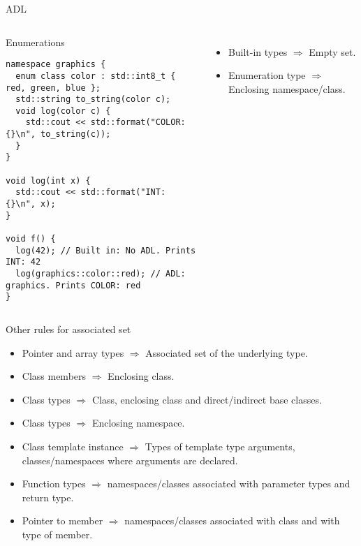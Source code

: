 \begin{frame}[t,fragile]{ADL}

\begin{columns}[T]

\begin{block}{Enumerations}
\begin{lstlisting}
namespace graphics {
  enum class color : std::int8_t { red, green, blue };
  std::string to_string(color c);
  void log(color c) {
    std::cout << std::format("COLOR: {}\n", to_string(c));
  }
}

void log(int x) {
  std::cout << std::format("INT: {}\n", x);
}

void f() {
  log(42); // Built in: No ADL. Prints INT: 42
  log(graphics::color::red); // ADL: graphics. Prints COLOR: red
}
\end{lstlisting}
\end{block}

\begin{itemize}
  \item Built-in types $\Rightarrow$ Empty set.
  \item Enumeration type $\Rightarrow$ Enclosing namespace/class.
\end{itemize}

\end{columns}
\end{frame}

\begin{frame}[t,fragile]{Other rules for associated set}
\begin{itemize}
  \item Pointer and array types $\Rightarrow$ Associated set of the underlying type.
  \item Class members $\Rightarrow$ Enclosing class.
  \item Class types $\Rightarrow$ Class, enclosing class and direct/indirect base classes.
  \item Class types $\Rightarrow$ Enclosing namespace.
  \item Class template instance $\Rightarrow$ Types of template type arguments, 
        classes/namespaces where arguments are declared.
  \item Function types $\Rightarrow$ namespaces/classes associated with parameter types and return type.
  \item Pointer to member $\Rightarrow$ namespaces/classes associated with class and with type of member.
\end{itemize}
\end{frame}

